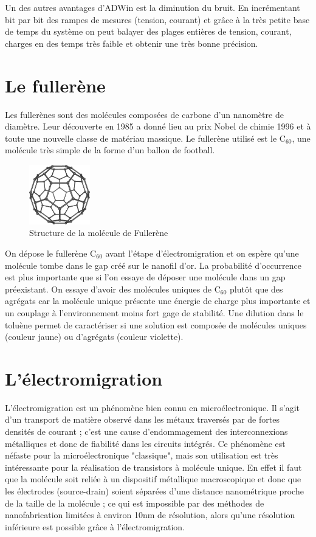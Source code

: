 Un des autres avantages d'ADWin est la diminution du bruit. En incrémentant bit par bit des rampes de mesures (tension, courant) et grâce à la très petite base de temps du système on peut balayer des plages entières de tension, courant, charges en des temps très faible et obtenir une très bonne précision.

\section{Le fullerène}
Les fullerènes sont des molécules composées de carbone d'un nanomètre de diamètre. Leur découverte en 1985 a donné lieu au prix Nobel de chimie 1996 et à toute une nouvelle classe de matériau massique. Le fullerène utilisé est le C$_{60}$, une molécule très simple de la forme d'un ballon de football.

\begin{figure}[h]
    \begin{center}
        \includegraphics[width=100px]{Images/C60.png}
        \caption{Structure de la molécule de Fullerène}
        \label{fig:}
    \end{center}
\end{figure}

On dépose le fullerène C$_{60}$ avant l'étape d'électromigration et on espère qu'une molécule tombe dans le gap créé sur le nanofil d'or. La probabilité d'occurrence est plus importante que si l'on essaye de déposer une molécule dans un gap préexistant. On essaye d'avoir des molécules uniques de C$_{60}$ plutôt que des agrégats car la molécule unique présente une énergie de charge plus importante et un couplage à l'environnement moins fort gage de stabilité. Une dilution dans le toluène permet de caractériser si une solution est composée de molécules uniques (couleur jaune) ou d'agrégats (couleur violette).


\section{L'électromigration}
L'électromigration est un phénomène bien connu en microélectronique. Il s'agit d'un transport de matière observé dans les métaux traversés par de fortes densités de courant ; c'est une cause d'endommagement des interconnexions métalliques et donc de fiabilité dans les circuits intégrés\cite{8}. Ce phénomène est néfaste pour la microélectronique "classique", mais son utilisation est très intéressante pour la réalisation de transistors à molécule unique. En effet il faut que la molécule soit reliée à un dispositif métallique macroscopique et donc que les électrodes (source-drain) soient séparées d'une distance nanométrique proche de la taille de la molécule ; ce qui est impossible par des méthodes de nanofabrication limitées à environ 10nm de résolution, alors qu'une résolution inférieure est possible grâce à l'électromigration\cite{9}.\\

